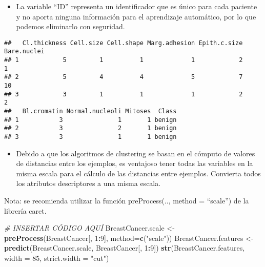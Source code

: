 \documentclass[]{article}
\newenvironment{Shaded}{\begin{snugshade}}{\end{snugshade}}
\newcommand{\CommentTok}[1]{\textcolor[rgb]{0.56,0.35,0.01}{\textit{#1}}}
\newcommand{\DataTypeTok}[1]{\textcolor[rgb]{0.13,0.29,0.53}{#1}}
\newcommand{\DecValTok}[1]{\textcolor[rgb]{0.00,0.00,0.81}{#1}}
\newcommand{\KeywordTok}[1]{\textcolor[rgb]{0.13,0.29,0.53}{\textbf{#1}}}
\newcommand{\NormalTok}[1]{#1}
\newcommand{\OperatorTok}[1]{\textcolor[rgb]{0.81,0.36,0.00}{\textbf{#1}}}
\newcommand{\OtherTok}[1]{\textcolor[rgb]{0.56,0.35,0.01}{#1}}
\newcommand{\StringTok}[1]{\textcolor[rgb]{0.31,0.60,0.02}{#1}}
\providecommand{\tightlist}{%
  \setlength{\itemsep}{0pt}\setlength{\parskip}{0pt}}
\begin{document}
\begin{itemize}
\tightlist
\item
  La variable ``ID'' representa un identificador que es único para cada
  paciente y no aporta ninguna información para el aprendizaje
  automático, por lo que podemos eliminarlo con seguridad.
\end{itemize}

\begin{Shaded}
\end{Shaded}

\begin{verbatim}
##   Cl.thickness Cell.size Cell.shape Marg.adhesion Epith.c.size Bare.nuclei
## 1            5         1          1             1            2           1
## 2            5         4          4             5            7          10
## 3            3         1          1             1            2           2
##   Bl.cromatin Normal.nucleoli Mitoses  Class
## 1           3               1       1 benign
## 2           3               2       1 benign
## 3           3               1       1 benign
\end{verbatim}

\begin{itemize}
\tightlist
\item
  Debido a que los algoritmos de clustering se basan en el cómputo de
  valores de distancias entre los ejemplos, es ventajoso tener todas las
  variables en la misma escala para el cálculo de las distancias entre
  ejemplos. Convierta todos los atributos descriptores a una misma
  escala.
\end{itemize}

Nota: se recomienda utilizar la función preProcess(.., method =
``scale'') de la librería caret.

\begin{Shaded}
\begin{Highlighting}[]
\CommentTok{# INSERTAR CÓDIGO AQUÍ}
\NormalTok{BreastCancer.scale <-}\StringTok{ }\KeywordTok{preProcess}\NormalTok{(BreastCancer[, }\DecValTok{1}\OperatorTok{:}\DecValTok{9}\NormalTok{], }\DataTypeTok{method=}\KeywordTok{c}\NormalTok{(}\StringTok{"scale"}\NormalTok{))}
\NormalTok{BreastCancer.features <-}\StringTok{ }\KeywordTok{predict}\NormalTok{(BreastCancer.scale, BreastCancer[, }\DecValTok{1}\OperatorTok{:}\DecValTok{9}\NormalTok{])}
\KeywordTok{str}\NormalTok{(BreastCancer.features, }\DataTypeTok{width =} \DecValTok{85}\NormalTok{, }\DataTypeTok{strict.width =} \StringTok{"cut"}\NormalTok{)}
\end{Highlighting}
\end{Shaded}
\end{document}
